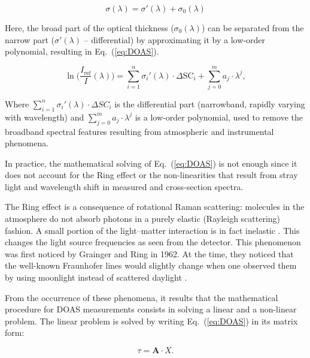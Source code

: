 \begin{equation}
      \label{eq:separation}
      \sigma(\lambda) = \sigma{'}(\lambda) + \sigma_{0}(\lambda)
\end{equation}

Here, the broad part of the optical thickness ($\sigma_{0}(\lambda)$)
can be separated from the narrow part ($\sigma{'}(\lambda)$ --
differential) by approximating it by a low-order polynomial, resulting
in Eq.~(\ref{eq:DOAS}).

\begin{equation}
      \label{eq:DOAS}
      \ln\Big( \frac{I_\mathrm{ref}}{I}(\lambda) \Big) = \sum_{i = 1}^{n} \sigma_{i}{'}(\lambda) \cdot \Delta \mathrm{SC}_{i} + \sum_{j = 0}^{m} a_{j} \cdot
      \lambda^{j},
\end{equation}

Where $\sum_{i = 1}^{n} \sigma_{i}{'}(\lambda) \cdot \Delta SC_{i}$ is
the differential part (narrowband, rapidly varying with wavelength) and
$\sum_{j = 0}^{m} a_{j} \cdot \lambda^{j}$ is a low-order polynomial,
used to remove the broadband spectral features resulting from
atmospheric and instrumental phenomena.


In practice, the mathematical solving of Eq.~(\ref{eq:DOAS}) is not
enough since it does not account for the Ring effect or the
non-linearities that result from stray light and wavelength shift in
measured and cross-section spectra.

The Ring effect is a consequence of rotational Raman scattering:
molecules in the atmosphere do not absorb photons in a purely elastic
(Rayleigh scattering) fashion. A small portion of the light--matter
interaction is in fact inelastic \cite{Brinkmann1968,Merlaud2013}. This
changes the light source frequencies as seen from the detector. This
phenomenon was first noticed by Grainger and Ring in 1962. At the time,
they noticed that the well-known Fraunhofer lines would slightly change
when one  observed them by using moonlight instead of scattered daylight
\cite{GRAINGER1962}.

From the occurrence of these phenomena, it results that the mathematical
procedure for DOAS measurements consists in solving a linear and a
non-linear problem. The linear problem is solved by writing
Eq.~(\ref{eq:DOAS}) in its matrix form:

\begin{equation}
      \label{eq:DOAS_matrix}
      \tau = \mathbf{A} \cdot X.
\end{equation}

